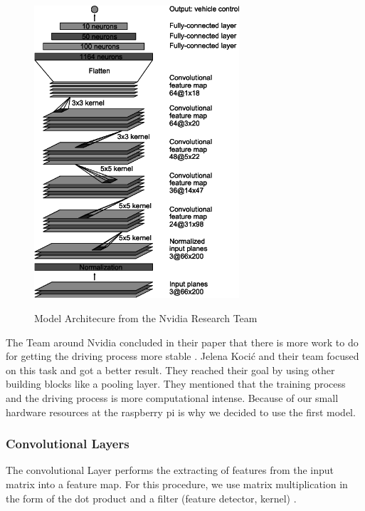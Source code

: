 \documentclass[journal]{IEEEtran}
\begin{document}
\begin{figure}
  \begin{center}
  \includegraphics[width=3in]{photo/CNNArchitecture.png}\\
  \caption{Model Architecure from the Nvidia Research Team \cite{LearningForSelf-DrivingCars}}\label{featuremap}
  \label{fig:Archi}
  \end{center}
\end{figure}

The Team around Nvidia concluded in their paper that there is more work to do for getting the driving process more stable \cite{LearningForSelf-DrivingCars}. Jelena Kocić and their team focused on this task and got a better result. They reached their goal by using other building blocks like a pooling layer. They mentioned that the training process and the driving process is more computational intense. Because of our small hardware resources at the raspberry pi is why we decided to use the first model. \cite{AutomotivePlatformsAutonomousDriving}
\subsubsection{Convolutional Layers}
\noindent The convolutional Layer performs the extracting of features from the input matrix into a feature map. For this procedure, we use matrix multiplication in the form of the dot product and a filter (feature detector, kernel) \cite{Goodfellow-et-al-2016}. 
\end{document}
